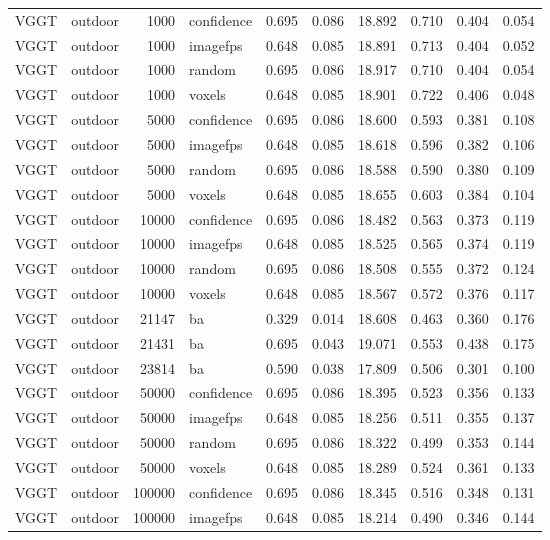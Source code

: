 \begin{table}[H]
\begin{tabular}{llrlrrrrrr}
VGGT & outdoor & 1000 & confidence & 0.695 & 0.086 & 18.892 & 0.710 & 0.404 & 0.054 \\
VGGT & outdoor & 1000 & imagefps & 0.648 & 0.085 & 18.891 & 0.713 & 0.404 & 0.052 \\
VGGT & outdoor & 1000 & random & 0.695 & 0.086 & 18.917 & 0.710 & 0.404 & 0.054 \\
VGGT & outdoor & 1000 & voxels & 0.648 & 0.085 & 18.901 & 0.722 & 0.406 & 0.048 \\
VGGT & outdoor & 5000 & confidence & 0.695 & 0.086 & 18.600 & 0.593 & 0.381 & 0.108 \\
VGGT & outdoor & 5000 & imagefps & 0.648 & 0.085 & 18.618 & 0.596 & 0.382 & 0.106 \\
VGGT & outdoor & 5000 & random & 0.695 & 0.086 & 18.588 & 0.590 & 0.380 & 0.109 \\
VGGT & outdoor & 5000 & voxels & 0.648 & 0.085 & 18.655 & 0.603 & 0.384 & 0.104 \\
VGGT & outdoor & 10000 & confidence & 0.695 & 0.086 & 18.482 & 0.563 & 0.373 & 0.119 \\
VGGT & outdoor & 10000 & imagefps & 0.648 & 0.085 & 18.525 & 0.565 & 0.374 & 0.119 \\
VGGT & outdoor & 10000 & random & 0.695 & 0.086 & 18.508 & 0.555 & 0.372 & 0.124 \\
VGGT & outdoor & 10000 & voxels & 0.648 & 0.085 & 18.567 & 0.572 & 0.376 & 0.117 \\
VGGT & outdoor & 21147 & ba & 0.329 & 0.014 & 18.608 & 0.463 & 0.360 & 0.176 \\
VGGT & outdoor & 21431 & ba & 0.695 & 0.043 & 19.071 & 0.553 & 0.438 & 0.175 \\
VGGT & outdoor & 23814 & ba & 0.590 & 0.038 & 17.809 & 0.506 & 0.301 & 0.100 \\
VGGT & outdoor & 50000 & confidence & 0.695 & 0.086 & 18.395 & 0.523 & 0.356 & 0.133 \\
VGGT & outdoor & 50000 & imagefps & 0.648 & 0.085 & 18.256 & 0.511 & 0.355 & 0.137 \\
VGGT & outdoor & 50000 & random & 0.695 & 0.086 & 18.322 & 0.499 & 0.353 & 0.144 \\
VGGT & outdoor & 50000 & voxels & 0.648 & 0.085 & 18.289 & 0.524 & 0.361 & 0.133 \\
VGGT & outdoor & 100000 & confidence & 0.695 & 0.086 & 18.345 & 0.516 & 0.348 & 0.131 \\
VGGT & outdoor & 100000 & imagefps & 0.648 & 0.085 & 18.214 & 0.490 & 0.346 & 0.144 \\

\end{tabular}
\end{table}
